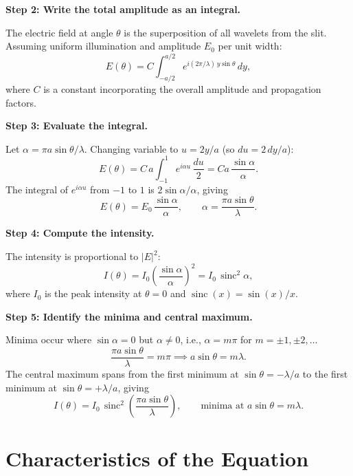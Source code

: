 \textbf{Step 2: Write the total amplitude as an integral.}

The electric field at angle $\theta$ is the superposition of all wavelets from the slit. Assuming uniform illumination and amplitude $E_0$ per unit width:
\begin{equation}
E(\theta) = C\int_{-a/2}^{a/2} e^{i(2\pi/\lambda)\,y\sin\theta}\,dy,
\end{equation}
where $C$ is a constant incorporating the overall amplitude and propagation factors.

\textbf{Step 3: Evaluate the integral.}

Let $\alpha = \pi a\sin\theta/\lambda$. Changing variable to $u = 2y/a$ (so $du = 2\,dy/a$):
\begin{equation}
E(\theta) = C\,a\int_{-1}^{1} e^{i\alpha u}\,\frac{du}{2} = Ca\,\frac{\sin\alpha}{\alpha}.
\end{equation}
The integral of $e^{i\alpha u}$ from $-1$ to $1$ is $2\sin\alpha/\alpha$, giving
\begin{equation}
E(\theta) = E_0\,\frac{\sin\alpha}{\alpha}, \qquad \alpha = \frac{\pi a\sin\theta}{\lambda}.
\end{equation}

\textbf{Step 4: Compute the intensity.}

The intensity is proportional to $|E|^2$:
\begin{equation}
I(\theta) = I_0\left(\frac{\sin\alpha}{\alpha}\right)^2 = I_0\,\operatorname{sinc}^2\alpha,
\end{equation}
where $I_0$ is the peak intensity at $\theta = 0$ and $\operatorname{sinc}(x) = \sin(x)/x$.

\textbf{Step 5: Identify the minima and central maximum.}

Minima occur where $\sin\alpha = 0$ but $\alpha \neq 0$, i.e., $\alpha = m\pi$ for $m = \pm 1, \pm 2, \ldots$
\begin{equation}
\frac{\pi a\sin\theta}{\lambda} = m\pi \implies a\sin\theta = m\lambda.
\end{equation}
The central maximum spans from the first minimum at $\sin\theta = -\lambda/a$ to the first minimum at $\sin\theta = +\lambda/a$, giving
\begin{equation}
\boxed{I(\theta) = I_0\,\operatorname{sinc}^2\!\left(\frac{\pi a\sin\theta}{\lambda}\right), \qquad \text{minima at } a\sin\theta = m\lambda.}
\end{equation}

\section*{Characteristics of the Equation}

